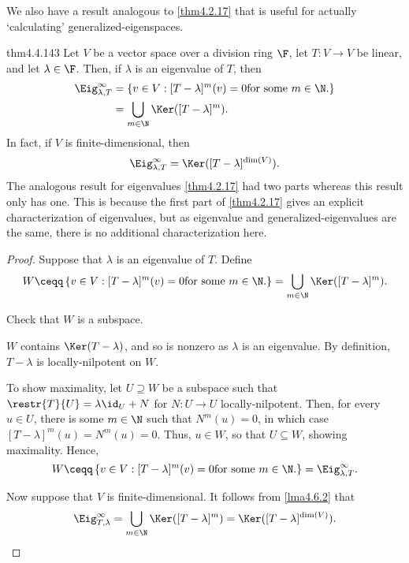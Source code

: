 We also have a result analogous to \cref{thm4.2.17} that is useful for actually `calculating' generalized-eigenspaces.
\begin{thm}{}{thm4.4.143}
	Let $V$ be a vector space over a division ring $\F$, let $T\colon V\rightarrow V$ be linear, and let $\lambda \in \F$.  Then, if $\lambda$ is an eigenvalue of $T$, then
	\begin{equation}
		\begin{split}
			\Eig _{\lambda ,T}^{\infty} & =\left\{ v\in V:[T-\lambda ]^m(v)=0\text{for some }m\in \N \text{.}\right\} \\
			& =\bigcup _{m\in \N}\Ker ([T-\lambda ]^m).
		\end{split}
	\end{equation}
	In fact, if $V$ is finite-dimensional, then
	\begin{equation}
		\Eig _{\lambda ,T}^{\infty}=\Ker ([T-\lambda ]^{\dim (V)}).
	\end{equation}
	The analogous result for eigenvalues \cref{thm4.2.17} had two parts whereas this result only has one.  This is because the first part of \cref{thm4.2.17} gives an explicit characterization of eigenvalues, but as eigenvalue and generalized-eigenvalues are the same, there is no additional characterization here.
	\begin{proof}
		Suppose that $\lambda$ is an eigenvalue of $T$.  Define
		\begin{equation}
			W\ceqq \left\{ v\in V:[T-\lambda ]^m(v)=0\text{for some }m\in \N \text{.}\right\} =\bigcup _{m\in \N}\Ker ([T-\lambda ]^m).
		\end{equation}
		\begin{exr}[breakable=false]{}{}
			Check that $W$ is a subspace.
		\end{exr}
		$W$ contains $\Ker (T-\lambda )$, and so is nonzero as $\lambda$ is an eigenvalue.  By definition, $T-\lambda$ is locally-nilpotent on $W$.
		
		To show maximality, let $U\supseteq W$ be a subspace such that $\restr{T}{U}=\lambda \id _U+N$ for $N\colon U\rightarrow U$ locally-nilpotent.  Then, for every $u\in U$, there is some $m\in \N$ such that $N^m(u)=0$, in which case $[T-\lambda ]^m(u)=N^m(u)=0$.  Thus, $u\in W$, so that $U\subseteq W$, showing maximality.  Hence,
		\begin{equation}
		W\ceqq \left\{ v\in V:[T-\lambda ]^m(v)=0\text{for some }m\in \N \text{.}\right\} =\Eig _{\lambda ,T}^{\infty}.
		\end{equation}
		
		Now suppose that $V$ is finite-dimensional.  It follows from \cref{lma4.6.2} that
		\begin{equation}
			\Eig _{T,\lambda}^{\infty}=\bigcup _{m\in \N}\Ker ([T-\lambda ]^m)=\Ker ([T-\lambda ]^{\dim (V)}).
		\end{equation}
	\end{proof}
\end{thm}
